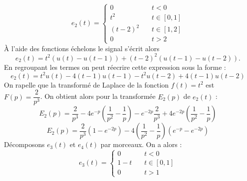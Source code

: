 \begin{figure}[!h]
    \centering
    
\end{figure}
\[
e_2(t)=
\begin{cases}
    0&\quad t<0\\
    t^2&\quad t\in[0,1]\\
    (t-2)^2&\quad t\in[1,2]\\
    0&\quad t>2
\end{cases}
\]
\`A l'aide des fonctions échelons le signal s'écrit alors 
\[
    e_2(t)=t^2\left(u(t)-u(t-1)\right)+(t-2)^2\left(u(t-1)-u(t-2)\right).
\]
En regroupant les termes on peut réecrire cette expression sous la forme :
\[
    e_2(t)=t^2u(t)-4(t-1)u(t-1)-t^2u(t-2)+4(t-1)u(t-2)
\]
On rapelle que la transformé de Laplace de la fonction $f(t)=t^2$ 
est $F(p)=\dfrac{2}{p^3}$. On obtient alors pour la transformée 
$E_2(p)$ de $e_2(t)$ :
\[
    E_2(p)=\dfrac{2}{p^3}-4e^{-p}\left(\dfrac{1}{p^2}-\dfrac{1}{p}\right)
        -e^{-2p}\dfrac{2}{p^3}+4e^{-2p}\left(\dfrac{1}{p^2}-\dfrac{1}{p}\right)
\]
\[
    E_2(p)=\dfrac{2}{p^3}\left(1-e^{-2p}\right)
        -4\left(\dfrac{1}{p^2}-\dfrac{1}{p}\right)\left(e^{-p}-e^{-2p}\right)
\]
Décomposons $e_3(t)$ et $e_4(t)$ par morceaux. On a alors :
\[
e_3(t)=
\begin{cases}
    0&\quad t<0\\
    1-t&\quad t\in[0,1]\\
    0&\quad t>1
\end{cases}
\]
